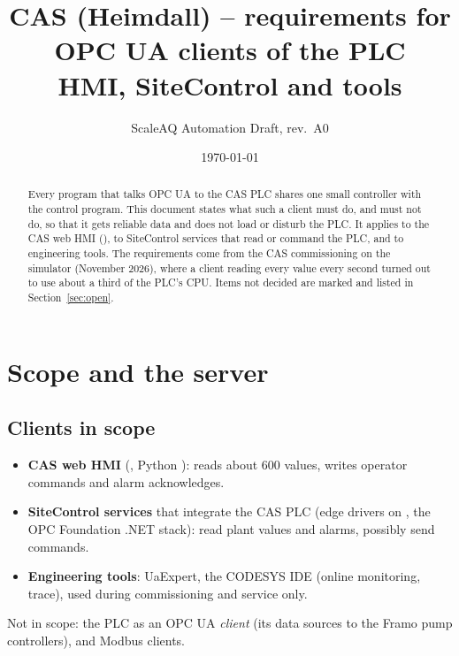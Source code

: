 \documentclass[11pt,a4paper]{article}
\title{CAS (Heimdall) -- requirements for OPC UA clients of the PLC\\[1mm]\Large HMI, SiteControl and tools}
\author{ScaleAQ Automation \quad Draft, rev.~A0}
\date{\today}
\begin{document}
\maketitle

\begin{abstract}
\noindent Every program that talks OPC UA to the CAS PLC shares one small controller with the control
program. This document states what such a client must do, and must not do, so that it gets reliable
data and does not load or disturb the PLC. It applies to the CAS web HMI (),
to SiteControl services that read or command the PLC, and to engineering tools. The requirements come
from the CAS commissioning on the simulator (November 2026), where a client reading every value every
second turned out to use about a third of the PLC's CPU. Items not decided are marked  and
listed in Section~\ref{sec:open}.
\end{abstract}

\tableofcontents

\section{Scope and the server}
\label{sec:scope}

\subsection{Clients in scope}
\begin{itemize}[nosep]
  \item \textbf{CAS web HMI} (, Python ): reads about 600 values,
        writes operator commands and alarm acknowledges.
  \item \textbf{SiteControl services} that integrate the CAS PLC (edge drivers on
        , the OPC Foundation .NET stack): read plant values and alarms,
        possibly send commands.
  \item \textbf{Engineering tools}: UaExpert, the CODESYS IDE (online monitoring, trace), used during
        commissioning and service only.
\end{itemize}
Not in scope: the PLC as an OPC UA \emph{client} (its data sources to the Framo pump controllers), and
Modbus clients.
\end{document}
